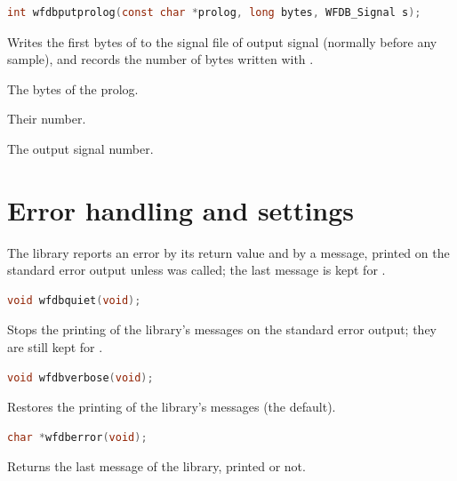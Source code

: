 \begin{lstlisting}[language=C,style=signature]
int wfdbputprolog(const char *prolog, long bytes, WFDB_Signal s);
\end{lstlisting}
Writes the first  bytes of  to the signal file of
output signal  (normally before any sample), and records the number
of bytes written with .
\begin{params}
\item[prolog] The bytes of the prolog.
\item[bytes] Their number.
\item[s] The output signal number.
\end{params}

\section{Error handling and settings}
\label{sec:library-errors}

The library reports an error by its return value and by a message, printed on
the standard error output unless  was called; the last
message is kept for .

\begin{lstlisting}[language=C,style=signature]
void wfdbquiet(void);
\end{lstlisting}
Stops the printing of the library's messages on the standard error output;
they are still kept for .

\begin{lstlisting}[language=C,style=signature]
void wfdbverbose(void);
\end{lstlisting}
Restores the printing of the library's messages (the default).

\begin{lstlisting}[language=C,style=signature]
char *wfdberror(void);
\end{lstlisting}
Returns the last message of the library, printed or not.

